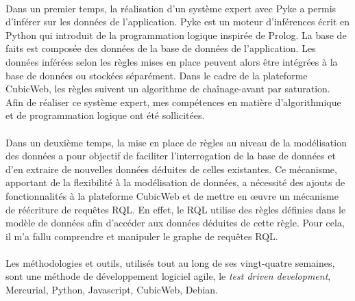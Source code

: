 \documentclass {report}
\begin{document}
\paragraph{}
Dans un premier temps, la réalisation d'un système expert avec Pyke a permis d'inférer sur les données de l'application. Pyke est un moteur d'inférences écrit en Python qui introduit de la programmation logique inspirée de Prolog. La base de faits est composée des données de la base de données de l'application. Les données inférées selon les règles mises en place peuvent alors être intégrées à la base de données ou stockées séparément. Dans le cadre de la plateforme CubicWeb, les règles suivent un algorithme de chaînage-avant par saturation. Afin de réaliser ce système expert, mes compétences en matière d'algorithmique et de programmation logique ont été sollicitées.
\paragraph{}
Dans un deuxième temps, la mise en place de règles au niveau de la modélisation des données a pour objectif de faciliter l'interrogation de la base de données et d'en extraire de nouvelles données déduites de celles existantes. Ce mécanisme, apportant de la flexibilité à la modélisation de données, a nécessité des ajouts de fonctionnalités à la plateforme CubicWeb et de mettre en œuvre un mécanisme de réécriture de requêtes RQL. En effet, le RQL utilise des règles définies dans le modèle de données afin d'accéder aux données déduites de cette règle. Pour cela, il m'a fallu comprendre et manipuler le graphe de requêtes RQL.
\paragraph{}
Les méthodologies et outils, utilisés tout au long de ses vingt-quatre semaines, sont une méthode de développement logiciel agile, le \textit{test driven development}, Mercurial, Python, Javascript, CubicWeb, Debian.

\tableofcontents
\end{document}
